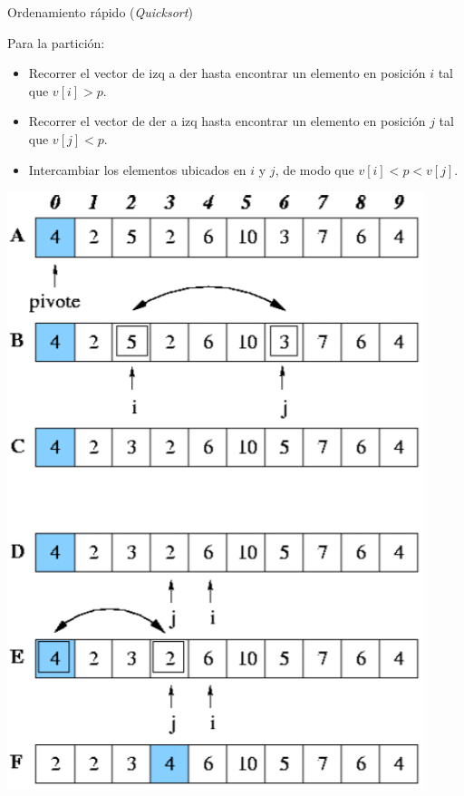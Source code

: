 \documentclass{beamer} %
\begin{document}
\begin{frame}{Ordenamiento rápido ({\em Quicksort})}
    \begin{minipage}{0.51\textwidth}
    {\small Para la partición:
    \begin{itemize}
        \item Recorrer el vector de izq a der hasta encontrar un elemento en posición $i$ tal que $v[i]>p$.
        \item Recorrer el vector de der a izq hasta encontrar un elemento en posición $j$ tal que $v[j]<p$.
        \item Intercambiar los elementos ubicados en $i$ y $j$, de modo que $v[i]<p<v[j]$.
    \end{itemize}}
    \end{minipage}
    \begin{minipage}{0.47\textwidth}
        \begin{center}
            \includegraphics[width=.9\textwidth]{./image/cap5/quicksort2.png}
        \end{center}
    \end{minipage}
\end{frame}
\end{document}

